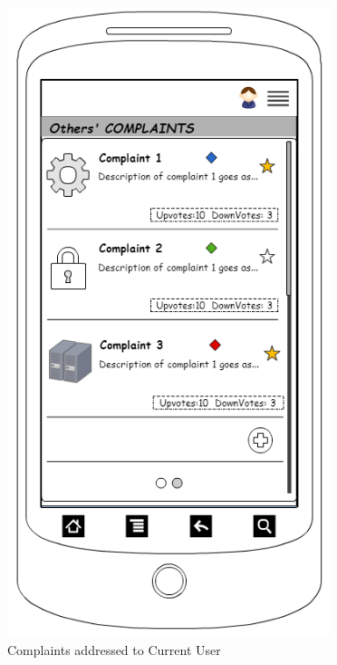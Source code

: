 \documentclass[12pt]{article}
\begin{document}
\begin{figure}[!ht]
\begin{minipage}{.49\textwidth}
        \includegraphics[width=0.84\textwidth]{./appMockUp/othersComplaintsScreen}
        \caption{Complaints addressed to Current User}
        \label{fig:othersComplaintsScreen}
      \end{minipage}

    \end{figure}
      
\end{document}
